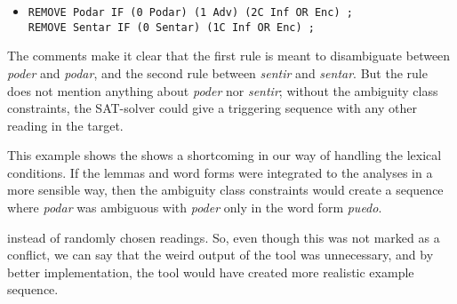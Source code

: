 



\begin{itemize}
\item[] 
\texttt{REMOVE Podar  IF (0 Podar) (1 Adv) (2C Inf OR Enc) ;} \\
\texttt{REMOVE Sentar IF (0 Sentar) (1C Inf OR Enc) ;}
\end{itemize}

The comments make it clear that the first rule is meant to disambiguate between \emph{poder} and \emph{podar}, and the second rule between \emph{sentir} and \emph{sentar}. But the rule does not mention anything about \emph{poder} nor \emph{sentir}; without the ambiguity class constraints, the SAT-solver could give a triggering sequence with any other reading in the target.

This example shows the 
shows a shortcoming in our way of handling the lexical conditions. 
If the lemmas and word forms were integrated to the analyses in a more
sensible way, then the ambiguity class constraints would create a
sequence where \emph{podar} was ambiguous with \emph{poder} only in the
word form \emph{puedo}.

instead of randomly chosen readings. So, even though this was not marked as a conflict, we can say that the weird output of the tool was unnecessary, and by better implementation, the tool would have created more realistic example sequence.


